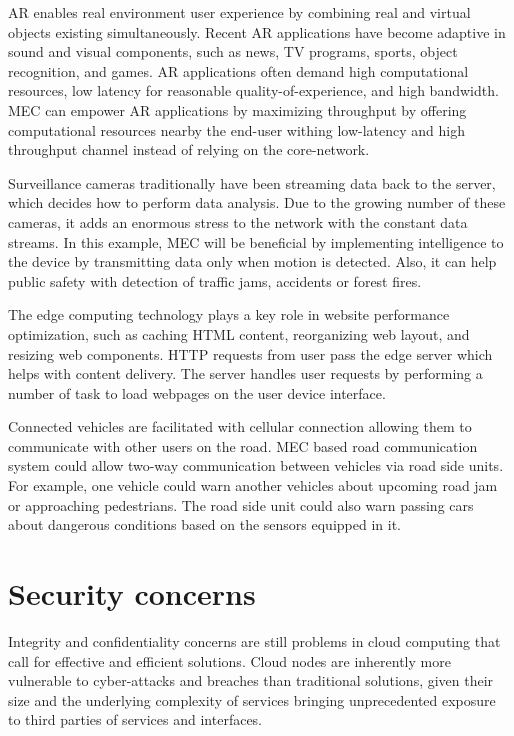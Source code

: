 AR enables real environment user experience by combining real and virtual objects existing simultaneously. Recent AR applications have become adaptive in sound and visual components, such as news, TV programs, sports, object recognition, and games. AR applications often demand high computational resources, low latency for reasonable quality-of-experience, and high bandwidth. MEC can empower AR applications by maximizing throughput by offering computational resources nearby the end-user withing low-latency and high throughput channel instead of relying on the core-network. \cite{Abbas2018}

Surveillance cameras traditionally have been streaming data back to the server, which decides how to perform data analysis. Due to the growing number of these cameras, it adds an enormous stress to the network with the constant data streams. In this example, MEC will be beneficial by implementing intelligence to the device by transmitting data only when motion is detected. Also, it can help public safety with detection of traffic jams, accidents or forest fires.

The edge computing technology plays a key role in website performance optimization, such as caching HTML content, reorganizing web layout, and resizing web components. HTTP requests from user pass the edge server which helps with content delivery. The server handles user requests by performing a number of task to load webpages on the user device interface. \cite{Abbas2018}

Connected vehicles are facilitated with cellular connection allowing them to communicate with other users on the road. MEC based road communication system could allow two-way communication between vehicles via road side units. For example, one vehicle could warn another vehicles about upcoming road jam or approaching pedestrians. The road side unit could also warn passing cars about dangerous conditions based on the sensors equipped in it. \cite{Abbas2018}

\section{Security concerns}

Integrity and confidentiality concerns are still problems in cloud computing that call for effective and efficient solutions. Cloud nodes are inherently more vulnerable to cyber-attacks and breaches than traditional solutions, given their size and the underlying complexity of services bringing unprecedented exposure to third parties of services and interfaces. \cite{Lombardi2011}

